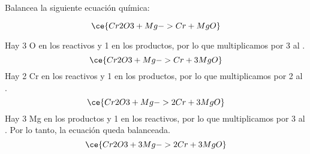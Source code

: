 Balancea la siguiente ecuación química:

\[
    \ce{Cr2O3 + Mg -> Cr + MgO}
\]

\begin{solutionbox}{5cm}
    Hay 3 O en los reactivos y 1 en los productos, por lo que multiplicamos por 3 al .
    \[
        \ce{Cr2O3 + Mg -> Cr + 3MgO}
    \]
    Hay 2 Cr en los reactivos y 1 en los productos, por lo que multiplicamos por 2 al .
    \[
        \ce{Cr2O3 + Mg -> 2Cr + 3MgO}
    \]
    Hay 3 Mg en los productos y 1 en los reactivos, por lo que multiplicamos por 3 al . Por lo tanto, la ecuación queda balanceada.
    \[
        \ce{Cr2O3 + 3Mg -> 2Cr + 3MgO}
    \]
\end{solutionbox}